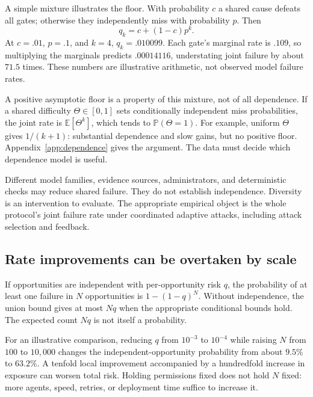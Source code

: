 \documentclass[10pt,twocolumn,letterpaper]{article}
\newcommand{\Prb}{\mathbb P}
\newcommand{\Exp}{\mathbb E}
\begin{document}
A simple mixture illustrates the floor. With probability $c$ a shared cause defeats all gates; otherwise they independently miss with probability $p$. Then
\begin{equation}
q_k=c+(1-c)p^k.
\label{eq:floor}
\end{equation}
At $c=.01$, $p=.1$, and $k=4$, $q_k=.010099$. Each gate's marginal rate is $.109$, so multiplying the marginals predicts $.00014116$, understating joint failure by about $71.5$ times. These numbers are illustrative arithmetic, not observed model failure rates.

A positive asymptotic floor is a property of this mixture, not of all dependence. If a shared difficulty $\Theta\in[0,1]$ sets conditionally independent miss probabilities, the joint rate is $\Exp[\Theta^k]$, which tends to $\Prb(\Theta=1)$. For example, uniform $\Theta$ gives $1/(k+1)$: substantial dependence and slow gains, but no positive floor. Appendix~\ref{app:dependence} gives the argument. The data must decide which dependence model is useful.

Different model families, evidence sources, administrators, and deterministic checks may reduce shared failure. They do not establish independence. Diversity is an intervention to evaluate. The appropriate empirical object is the whole protocol's joint failure rate under coordinated adaptive attacks, including attack selection and feedback.

\subsection{Rate improvements can be overtaken by scale}
If opportunities are independent with per-opportunity risk $q$, the probability of at least one failure in $N$ opportunities is $1-(1-q)^N$. Without independence, the union bound gives at most $Nq$ when the appropriate conditional bounds hold. The expected count $Nq$ is not itself a probability.

For an illustrative comparison, reducing $q$ from $10^{-3}$ to $10^{-4}$ while raising $N$ from $100$ to $10{,}000$ changes the independent-opportunity probability from about $9.5\%$ to $63.2\%$. A tenfold local improvement accompanied by a hundredfold increase in exposure can worsen total risk. Holding permissions fixed does not hold $N$ fixed: more agents, speed, retries, or deployment time suffice to increase it.
\end{document}
